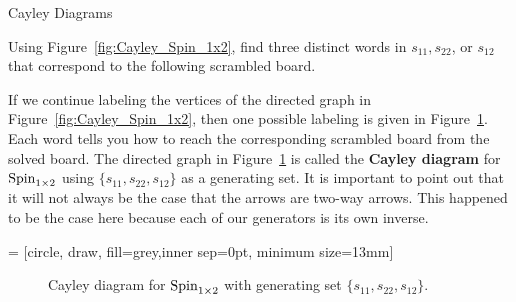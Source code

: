 \begin{section}{Cayley Diagrams}
\begin{problem}
Using Figure~\ref{fig:Cayley_Spin_1x2}, find three distinct words in $s_{11}, s_{22}$, or $s_{12}$ that correspond to the following scrambled board.
\begin{center}
\end{center}
\end{problem}

If we continue labeling the vertices of the directed graph in Figure~\ref{fig:Cayley_Spin_1x2}, then one possible labeling is given in Figure~\ref{fig:Cayley_Spin_1x2_group_labels}. Each word tells you how to reach the corresponding scrambled board from the solved board. The directed graph in Figure~\ref{fig:Cayley_Spin_1x2_group_labels} is called the \textbf{Cayley diagram} for $\operatorname{Spin}_{1\times 2}$ using $\{s_{11},s_{22},s_{12}\}$ as a generating set. It is important to point out that it will not always be the case that the arrows are two-way arrows. This happened to be the case here because each of our generators is its own inverse.

 = [circle, draw, fill=grey,inner sep=0pt, minimum size=13mm]

\begin{figure}[!ht]
\centering
{}
\caption{Cayley diagram for $\operatorname{Spin}_{1\times 2}$ with generating set $\{s_{11},s_{22},s_{12}\}$.}
\label{fig:Cayley_Spin_1x2_group_labels}
\end{figure}


\end{section}
